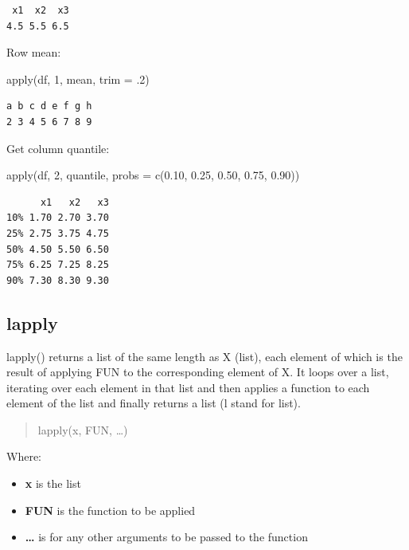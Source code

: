 \documentclass[
  letterpaper,
  DIV=11,
  numbers=noendperiod]{scrreprt}
\newenvironment{Shaded}{\begin{snugshade}}{\end{snugshade}}
\newcommand{\AttributeTok}[1]{\textcolor[rgb]{0.40,0.45,0.13}{#1}}
\newcommand{\DecValTok}[1]{\textcolor[rgb]{0.68,0.00,0.00}{#1}}
\newcommand{\FloatTok}[1]{\textcolor[rgb]{0.68,0.00,0.00}{#1}}
\newcommand{\FunctionTok}[1]{\textcolor[rgb]{0.28,0.35,0.67}{#1}}
\newcommand{\NormalTok}[1]{\textcolor[rgb]{0.00,0.23,0.31}{#1}}
\begin{document}
\begin{verbatim}
 x1  x2  x3 
4.5 5.5 6.5 
\end{verbatim}

Row mean:

\begin{Shaded}
\begin{Highlighting}[]
\FunctionTok{apply}\NormalTok{(df, }\DecValTok{1}\NormalTok{, mean, }\AttributeTok{trim =}\NormalTok{ .}\DecValTok{2}\NormalTok{)}
\end{Highlighting}
\end{Shaded}

\begin{verbatim}
a b c d e f g h 
2 3 4 5 6 7 8 9 
\end{verbatim}

Get column quantile:

\begin{Shaded}
\begin{Highlighting}[]
\FunctionTok{apply}\NormalTok{(df, }\DecValTok{2}\NormalTok{, quantile, }\AttributeTok{probs =} \FunctionTok{c}\NormalTok{(}\FloatTok{0.10}\NormalTok{, }\FloatTok{0.25}\NormalTok{, }\FloatTok{0.50}\NormalTok{, }\FloatTok{0.75}\NormalTok{, }\FloatTok{0.90}\NormalTok{))}
\end{Highlighting}
\end{Shaded}

\begin{verbatim}
      x1   x2   x3
10% 1.70 2.70 3.70
25% 2.75 3.75 4.75
50% 4.50 5.50 6.50
75% 6.25 7.25 8.25
90% 7.30 8.30 9.30
\end{verbatim}

\hypertarget{lapply}{%
\subsection{lapply}\label{lapply}}

lapply() returns a list of the same length as X (list), each element of
which is the result of applying FUN to the corresponding element of X.
It loops over a list, iterating over each element in that list and then
applies a function to each element of the list and finally returns a
list (l stand for list).

\begin{quote}
lapply(x, FUN, \ldots)
\end{quote}

Where:

\begin{itemize}
\item
  \textbf{x} is the list
\item
  \textbf{FUN} is the function to be applied
\item
  \textbf{\ldots{}} is for any other arguments to be passed to the
  function
\end{itemize}
\end{document}
